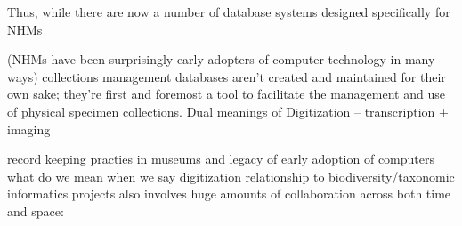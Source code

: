 Thus, while there are now a number of database systems designed specifically for NHMs

(NHMs have been surprisingly early adopters of computer technology in many ways)
collections management databases aren’t created and maintained for their own sake; they’re first and foremost a tool to facilitate the management and use of physical specimen collections. 
Dual meanings of Digitization – transcription + imaging


record keeping practies in museums and legacy of early adoption of computers
what do we mean when we say digitization
relationship to biodiversity/taxonomic informatics projects
also involves huge amounts of collaboration across both time and space:
